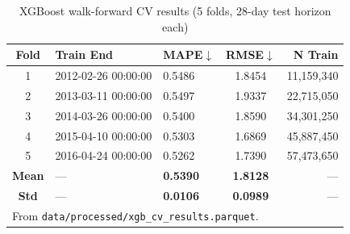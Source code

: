 \begin{table}[H]
\centering
\caption{XGBoost walk-forward CV results (5 folds, 28-day test horizon each)}
\label{tab:xgb_cv}
\begin{tabular}{@{}cllcr@{}}
\toprule
\textbf{Fold} & \textbf{Train End} & \textbf{MAPE}$\downarrow$ & \textbf{RMSE}$\downarrow$ & \textbf{N Train} \\
\midrule
1 & 2012-02-26 00:00:00 & 0.5486 & 1.8454 & 11,159,340 \\
2 & 2013-03-11 00:00:00 & 0.5497 & 1.9337 & 22,715,050 \\
3 & 2014-03-26 00:00:00 & 0.5400 & 1.8590 & 34,301,250 \\
4 & 2015-04-10 00:00:00 & 0.5303 & 1.6869 & 45,887,450 \\
5 & 2016-04-24 00:00:00 & 0.5262 & 1.7390 & 57,473,650 \\
\midrule
\textbf{Mean} & --- & \textbf{0.5390} & \textbf{1.8128} & --- \\
\textbf{Std}  & --- & \textbf{0.0106} & \textbf{0.0989}  & --- \\
\bottomrule
\multicolumn{5}{l}{\footnotesize From \texttt{data/processed/xgb\_cv\_results.parquet}.}
\end{tabular}
\end{table}
